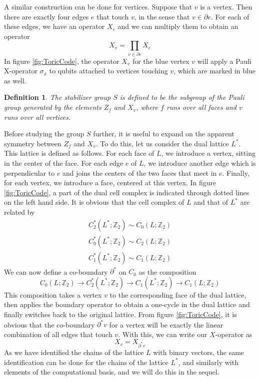 \documentclass[a4paper, draft]{article}
\theoremstyle{own}
\newtheorem{defn}{Definition}[section]
\theoremstyle{remark}
\newcommand{\Z}{\mathbb{Z}}
\begin{document}
A similar construction can be done for vertices. Suppose that $v$ is a vertex. Then there are exactly four edges $e$ that touch $v$, in the sense that $v \in \partial e$. For each of these edges, we have an operator $X_e$ and we can multiply them to obtain an operator
$$
X_v = \prod_{v \in \partial e} X_e
$$
In figure \ref{fig:ToricCode}, the operator $X_v$ for the blue vertex $v$ will apply a Pauli X-operator $\sigma_x$ to qubits attached to vertices touching $v$, which are marked in blue as well.

\begin{defn}
The stabilizer group $S$ is defined to be the subgroup of the Pauli group generated by the elements $Z_f$ and $X_v$, where $f$ runs over all faces and $v$ runs over all vertices.
\end{defn}

Before studying the group $S$ further, it is useful to expand on the apparent symmetry between $Z_f$ and $X_v$. To do this, let us consider the dual lattice $L^*$. This lattice is defined as follows. For each face of $L$, we introduce a vertex, sitting in the center of the face. For each edge $e$ of $L$, we introduce another edge which is perpendicular to $e$ and joins the centers of the two faces that meet in $e$. Finally, for each vertex, we introduce a face, centered at this vertex. In figure \ref{fig:ToricCode}, a part of the dual cell complex is indicated through dotted lines on the left hand side. It is obvious that the cell complex of $L$ and that of $L^*$ are related by
\begin{align*}
C_2^*(L^*;\Z_2) \sim C_0(L;\Z_2) \\
C_0^*(L^*;\Z_2) \sim C_2(L;\Z_2) \\
C_1^*(L^*;\Z_2) \sim C_1(L;\Z_2) 
\end{align*}
We can now define a co-boundary $\partial^*$ on $C_0$ as the composition
$$
C_0(L ; \Z_2) \rightarrow C_2^*(L^*; \Z_2) \rightarrow C_1(L^*;\Z_2) \rightarrow C_1(L;\Z_2)
$$
This composition takes a vertex $v$ to the corresponding face of the dual lattice, then applies the boundary operator to obtain a one-cycle in the dual lattice and finally switches back to the original lattice. From figure \ref{fig:ToricCode}, it is obvious that the co-boundary $\partial^* v$ for a vertex will be exactly the linear combination of all edges that touch $v$. With this, we can write our $X$-operator as
$$
X_v = X_{\partial^* v}
$$
As we have identified the chains of the lattice $L$ with binary vectors, the same identification can be done for the chains of the lattice $L^*$, and similarly with elements of the computational basis, and we will do this in the sequel.
\end{document}
